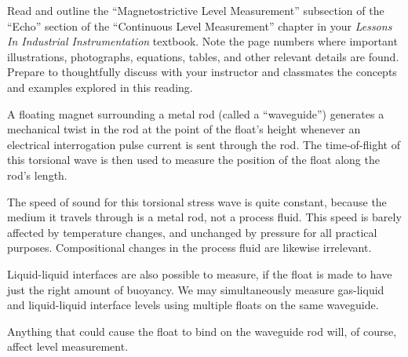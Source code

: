 

Read and outline the ``Magnetostrictive Level Measurement'' subsection of the ``Echo'' section of the ``Continuous Level Measurement'' chapter in your {\it Lessons In Industrial Instrumentation} textbook.  Note the page numbers where important illustrations, photographs, equations, tables, and other relevant details are found.  Prepare to thoughtfully discuss with your instructor and classmates the concepts and examples explored in this reading.














A floating magnet surrounding a metal rod (called a ``waveguide'') generates a mechanical twist in the rod at the point of the float's height whenever an electrical interrogation pulse current is sent through the rod.  The time-of-flight of this torsional wave is then used to measure the position of the float along the rod's length.

\vskip 10pt

The speed of sound for this torsional stress wave is quite constant, because the medium it travels through is a metal rod, not a process fluid.  This speed is barely affected by temperature changes, and unchanged by pressure for all practical purposes.  Compositional changes in the process fluid are likewise irrelevant.

\vskip 10pt

Liquid-liquid interfaces are also possible to measure, if the float is made to have just the right amount of buoyancy.  We may simultaneously measure gas-liquid and liquid-liquid interface levels using multiple floats on the same waveguide.

\vskip 10pt

Anything that could cause the float to bind on the waveguide rod will, of course, affect level measurement.







